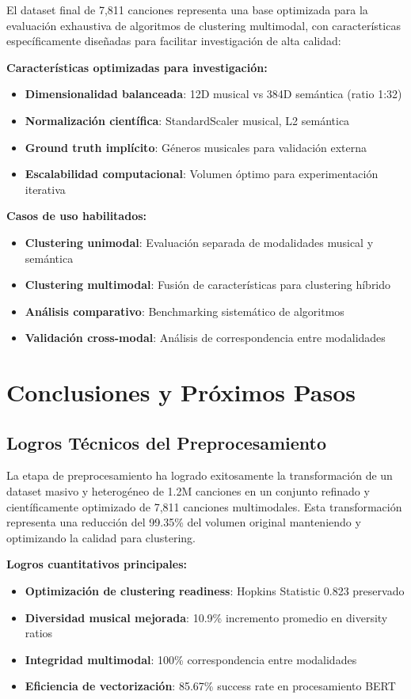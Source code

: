 \documentclass[12pt,a4paper]{report}
\begin{document}
El dataset final de 7,811 canciones representa una base optimizada para la evaluación exhaustiva de algoritmos de clustering multimodal, con características específicamente diseñadas para facilitar investigación de alta calidad:

\textbf{Características optimizadas para investigación:}
\begin{itemize}[leftmargin=*]
    \item \textbf{Dimensionalidad balanceada}: 12D musical vs 384D semántica (ratio 1:32)
    \item \textbf{Normalización científica}: StandardScaler musical, L2 semántica
    \item \textbf{Ground truth implícito}: Géneros musicales para validación externa
    \item \textbf{Escalabilidad computacional}: Volumen óptimo para experimentación iterativa
\end{itemize}

\textbf{Casos de uso habilitados:}
\begin{itemize}[leftmargin=*]
    \item \textbf{Clustering unimodal}: Evaluación separada de modalidades musical y semántica
    \item \textbf{Clustering multimodal}: Fusión de características para clustering híbrido
    \item \textbf{Análisis comparativo}: Benchmarking sistemático de algoritmos
    \item \textbf{Validación cross-modal}: Análisis de correspondencia entre modalidades
\end{itemize}

\section{Conclusiones y Próximos Pasos}

\subsection{Logros Técnicos del Preprocesamiento}

La etapa de preprocesamiento ha logrado exitosamente la transformación de un dataset masivo y heterogéneo de 1.2M canciones en un conjunto refinado y científicamente optimizado de 7,811 canciones multimodales. Esta transformación representa una reducción del 99.35\% del volumen original manteniendo y optimizando la calidad para clustering.

\textbf{Logros cuantitativos principales:}
\begin{itemize}[leftmargin=*]
    \item \textbf{Optimización de clustering readiness}: Hopkins Statistic 0.823 preservado
    \item \textbf{Diversidad musical mejorada}: 10.9\% incremento promedio en diversity ratios
    \item \textbf{Integridad multimodal}: 100\% correspondencia entre modalidades
    \item \textbf{Eficiencia de vectorización}: 85.67\% success rate en procesamiento BERT
\end{itemize}
\end{document}
